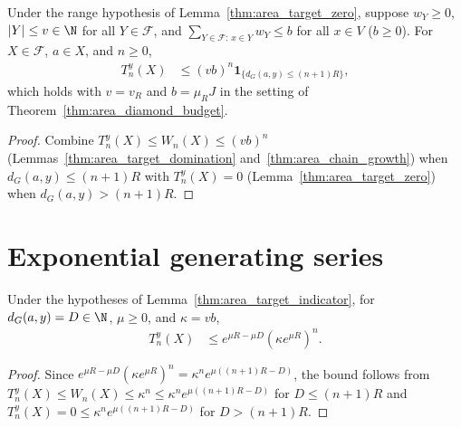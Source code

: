 \begin{lemma}
    \label{thm:area_target_indicator}
    \leanok
    Under the range hypothesis of Lemma~\ref{thm:area_target_zero}, suppose
    $w_Y\ge0$, $|Y|\le v\in\N$ for all $Y\in\mathcal F$, and
    $\sum_{Y\in\mathcal F:\,x\in Y}w_Y\le b$ for all $x\in V$ ($b\ge0$). For
    $X\in\mathcal F$, $a\in X$, and $n\ge0$,
    \begin{align}
        T_n^y(X) & \le(vb)^n\mathbf1_{\{d_G(a,y)\le(n+1)R\}},
        \label{eq:area_target_indicator}
    \end{align}
    which holds with $v=v_R$ and $b=\mu_RJ$ in the setting of
    Theorem~\ref{thm:area_diamond_budget}.
\end{lemma}
\begin{proof}
    \leanok
    Combine $T_n^y(X)\le W_n(X)\le(vb)^n$ (Lemmas~\ref{thm:area_target_domination}
    and~\ref{thm:area_chain_growth}) when $d_G(a,y)\le(n+1)R$ with
    $T_n^y(X)=0$ (Lemma~\ref{thm:area_target_zero}) when
    $d_G(a,y)>(n+1)R$.
\end{proof}

\section{Exponential generating series}

\begin{lemma}
    \label{thm:area_chain_exponential}
    \leanok
    Under the hypotheses of Lemma~\ref{thm:area_target_indicator}, for
    $d_G(a,y)=D\in\N$, $\mu\ge0$, and $\kappa=vb$,
    \begin{align}
        T_n^y(X) & \le e^{\mu R-\mu D}(\kappa e^{\mu R})^n.
        \label{eq:area_chain_exponential}
    \end{align}
\end{lemma}
\begin{proof}
    \leanok
    Since $e^{\mu R-\mu D}(\kappa e^{\mu R})^n=\kappa^n e^{\mu((n+1)R-D)}$,
    the bound follows from $T_n^y(X)\le W_n(X)\le\kappa^n\le\kappa^n e^{\mu((n+1)R-D)}$
    for $D\le(n+1)R$ and $T_n^y(X)=0\le\kappa^n e^{\mu((n+1)R-D)}$ for
    $D>(n+1)R$.
\end{proof}

